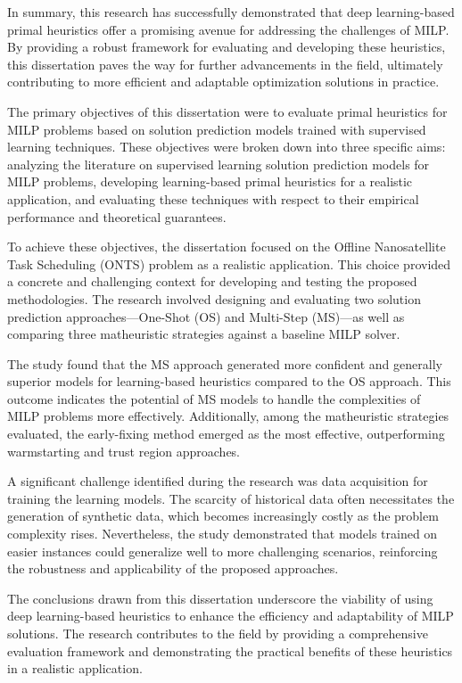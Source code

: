 In summary, this research has successfully demonstrated that deep learning-based primal heuristics offer a promising avenue for addressing the challenges of MILP.
By providing a robust framework for evaluating and developing these heuristics, this dissertation paves the way for further advancements in the field, ultimately contributing to more efficient and adaptable optimization solutions in practice.


The primary objectives of this dissertation were to evaluate primal heuristics for MILP problems based on solution prediction models trained with supervised learning techniques. These objectives were broken down into three specific aims: analyzing the literature on supervised learning solution prediction models for MILP problems, developing learning-based primal heuristics for a realistic application, and evaluating these techniques with respect to their empirical performance and theoretical guarantees.

To achieve these objectives, the dissertation focused on the Offline Nanosatellite Task Scheduling (ONTS) problem as a realistic application. This choice provided a concrete and challenging context for developing and testing the proposed methodologies. The research involved designing and evaluating two solution prediction approaches—One-Shot (OS) and Multi-Step (MS)—as well as comparing three matheuristic strategies against a baseline MILP solver.

The study found that the MS approach generated more confident and generally superior models for learning-based heuristics compared to the OS approach. This outcome indicates the potential of MS models to handle the complexities of MILP problems more effectively. Additionally, among the matheuristic strategies evaluated, the early-fixing method emerged as the most effective, outperforming warmstarting and trust region approaches.

A significant challenge identified during the research was data acquisition for training the learning models. The scarcity of historical data often necessitates the generation of synthetic data, which becomes increasingly costly as the problem complexity rises. Nevertheless, the study demonstrated that models trained on easier instances could generalize well to more challenging scenarios, reinforcing the robustness and applicability of the proposed approaches.

The conclusions drawn from this dissertation underscore the viability of using deep learning-based heuristics to enhance the efficiency and adaptability of MILP solutions. The research contributes to the field by providing a comprehensive evaluation framework and demonstrating the practical benefits of these heuristics in a realistic application.

